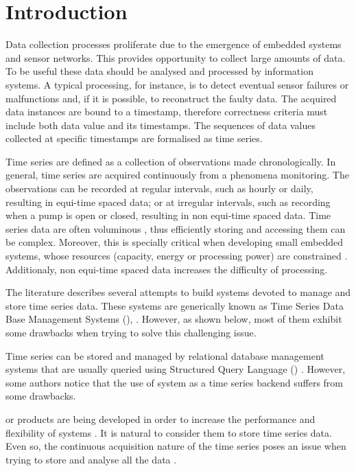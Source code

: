 \section{Introduction}

Data collection processes proliferate due to the emergence of embedded
systems and sensor networks.  This provides opportunity to collect
large amounts of data. To be useful these data should be analysed and
processed by information systems. A typical processing, for instance,
is to detect eventual sensor failures or malfunctions and, if it is
possible, to reconstruct the faulty data. The acquired data instances
are bound to a timestamp, therefore correctness criteria must include
both data value and its timestamps. The sequences of data values
collected at specific timestamps are formalised as time series.

Time series are defined as a collection of observations made
chronologically.  In general, time series are acquired continuously
from a phenomena monitoring. The observations can be recorded at
regular intervals, such as hourly or daily, resulting in equi-time
spaced data; or at irregular intervals, such as recording when a pump
is open or closed, resulting in non equi-time spaced data. Time series
data are often voluminous \cite{fu11,keogh08:isax}, thus efficiently
storing and accessing them can be complex. Moreover, this is specially
critical when developing small embedded systems, whose resources
(capacity, energy or processing power) are constrained
\cite{yaogehrke02}.  Additionaly, non equi-time spaced data increases
the difficulty of processing.

The literature describes several attempts to build systems devoted to
manage and store time series data. These systems are generically known
as Time Series Data Base Management Systems (),
\cite{dreyer94,last01}. However, as shown below, most of them exhibit
some drawbacks when trying to solve this challenging issue.

Time series can be stored and managed by relational database
management systems that are usually queried using Structured Query
Language () .
%
However, some authors
\cite{dreyer94,schmidt95,stonebraker09:scidb,zhang11} notice that the
use of  system as a time series backend suffers from some
drawbacks.

 or  products are being developed in order to
increase the performance and flexibility of  systems
\cite{atzeni13:relational_model_dead,stonebraker10,stonebraker09:scidb,zhang11}.
%
It is natural to consider them to store time series data. Even so, the
continuous acquisition nature of the time series poses an issue when
trying to store and analyse all the data \cite{keogh97}.

